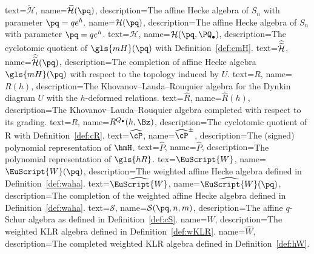  {
  text={\ensuremath{\mathcal{\widetilde{H}}}},
  name={\ensuremath{\mathcal{\widetilde{H}}(\pq)}},
   description={The affine Hecke algebra of $S_n$ with parameter $\pq=qe^h$.}
 }
  {
  name={\ensuremath{\mathcal{H}(\pq)}},
   description={The affine Hecke algebra of $S_n$ with parameter $\pq=qe^h$.}
 }
  {
  text={\ensuremath{\mathcal{H}}},
  name={\ensuremath{\mathcal{H}(\pq,\PQ_\bullet)}},
   description={The cyclotomic quotient of $\gls{mH}(\pq)$ with Definition~\ref{def:cmH}.}
 }
   {
  text={\ensuremath{\widehat{\widetilde{\mkern0mu\mathcal{H}}}}},
  name={\ensuremath{\widehat{\widetilde{\mkern0mu\mathcal{H}}}(\pq)}},
   description={The completion of affine Hecke algebra $\gls{mH}(\pq)$
   with respect to the topology induced by $U$.}
 }
   {
  text={\ensuremath{{R}}},
  name={\ensuremath{{R}(h)}},
   description={The Khovanov--Lauda--Rouquier algebra for the Dynkin
  diagram $U$ with the $h$-deformed relations.}
 }
    {
  text={\ensuremath{\widehat{R}}},
  name={\ensuremath{\widehat{R}(h)}},
   description={The Khovanov--Lauda--Rouquier algebra completed with
  respect to its grading.}
 }
    {
  text={\ensuremath{{R}}},
  name={\ensuremath{{R}^{Q_\bullet}(h,\Bz)}},
   description={The cyclotomic quotient of \gls{R} with Definition~\ref{def:cR}.}
 }
    {
  text={\ensuremath{\widehat{\cP}}},
  name={\ensuremath{\widehat{\cP}^\pm}},
   description={The (signed) polynomial representation of $\hmH$.}
 }
     {
  text={\ensuremath{\widehat{P}}},
  name={\ensuremath{\widehat{P}}},
   description={The polynomial representation of $\gls{hR}$.}
 }
      {
  tex={\ensuremath{\EuScript{W}}},
  name={\ensuremath{\EuScript{W}(\pq)}},
   description={The weighted affine Hecke algebra defined in
  Definition~\ref{def:waha}.}
 }
      {
  text={\ensuremath{\widehat{\EuScript{W}}}},
  name={\ensuremath{\widehat{\EuScript{W}}(\pq)}},
  description={The completion of the weighted affine Hecke algebra defined in
  Definition~\ref{def:waha}.}
 }
      {
  text={\ensuremath{\mathcal{S}}},
  name={\ensuremath{\mathcal{S}(\pq,n,m)}},
   description={The affine $q$-Schur algebra as defined in Definition~\ref{def:cS}.}
 }
       {
  name={\ensuremath{{W}}},
   description={The weighted KLR algebra defined in
  Definition~\ref{def:wKLR}.}
 }
       {
  name={\ensuremath{\widehat{W}}},
   description={The completed weighted KLR algebra defined in
  Definition~\ref{def:hW}.}
 }
